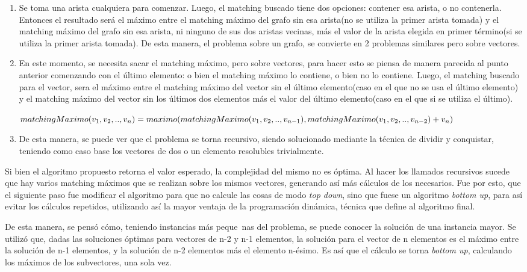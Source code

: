 \documentclass[a4paper, 12pt]{article}
\begin{document}
\begin{enumerate}
\item Se toma una arista cualquiera para comenzar. Luego, el matching buscado tiene dos opciones: contener esa arista, o no contenerla. Entonces el resultado será el máximo entre el matching máximo del grafo sin esa arista(no se utiliza la primer arista tomada) y el matching máximo del grafo sin esa arista, ni ninguno de sus dos aristas vecinas, más el valor de la arista elegida en primer término(si se utiliza la primer arista tomada). De esta manera, el problema sobre un grafo, se convierte en 2 problemas similares pero sobre vectores.
\item En este momento, se necesita sacar el matching máximo, pero sobre vectores, para hacer esto se piensa de manera parecida al punto anterior comenzando con el último elemento: o bien el matching máximo lo contiene, o bien no lo contiene. Luego, el matching buscado para el vector, sera el máximo entre el matching máximo del vector sin el último elemento(caso en el que no se usa el último elemento) y el matching máximo del vector sin los últimos dos elementos más el valor del último elemento(caso en el que si se utiliza el último).

	$matchingMaximo(v_1,v_2,..,v_n) = \\ maximo(matchingMaximo(v_1,v_2,..,v_{n-1}), \\ matchingMaximo(v_1,v_2,..,v_{n-2}) + v_n)$
\item De esta manera, se puede ver que el problema se torna recursivo, siendo solucionado mediante la técnica de dividir y conquistar, teniendo como caso base los vectores de dos o un elemento resolubles trivialmente.
\end{enumerate}

Si bien el algoritmo propuesto retorna el valor esperado, la complejidad del mismo no es óptima. Al hacer los llamados recursivos sucede que hay varios matching máximos que se realizan sobre los mismos vectores, generando así más cálculos de los necesarios. Fue por esto, que el siguiente paso fue modificar el algoritmo para que no calcule las cosas de modo \emph{top down}, sino que fuese un algoritmo \emph{bottom up}, para así evitar los cálculos repetidos, utilizando así la mayor ventaja de la programación dinámica, técnica que define al algoritmo final.

De esta manera, se pensó cómo, teniendo instancias más peque~{n}as del problema, se puede conocer la solución de una instancia mayor. Se utilizó que, dadas las soluciones óptimas para vectores de n-2 y n-1 elementos, la solución para el vector de n elementos es el máximo entre la solución de n-1 elementos, y la solución de n-2 elementos más el elemento n-ésimo. Es así que el cálculo se torna \emph{bottom up}, calculando los máximos de los subvectores, una sola vez.
\end{document}
